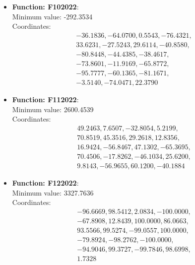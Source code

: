 \documentclass{article}
\begin{document}
\begin{itemize}
    \item \textbf{Function: F102022}: \\
      Minimum value: -292.3534 \\
      Coordinates:
      \[
        \begin{aligned}
          & -36.1836, -64.0700, 0.5543, -76.4321, \\
          & 33.6231, -27.5243, 29.6114, -40.8580, \\
          & -80.8448, -44.4385, -38.4617, \\
          & -73.8601, -11.9169, -65.8772, \\
          & -95.7777, -60.1365, -81.1671, \\
          & -3.5140, -74.0471, 22.3790
        \end{aligned}
      \]

    \item \textbf{Function: F112022}: \\
      Minimum value: 2600.4539 \\
      Coordinates:
      \[
        \begin{aligned}
          & 49.2463, 7.6507, -32.8054, 5.2199, \\
          & 70.8519, 45.3516, 29.2618, 12.8356, \\
          & 16.9424, -56.8467, 47.1302, -65.3695, \\
          & 70.4506, -17.8262, -46.1034, 25.6200, \\
          & 9.8143, -56.9655, 60.1200, -40.1884
        \end{aligned}
      \]

    \item \textbf{Function: F122022}: \\
      Minimum value: 3327.7636 \\
      Coordinates:
      \[
        \begin{aligned}
          & -96.6669, 98.5412, 2.0834, -100.0000, \\
          & -67.8908, 12.8439, 100.0000, 86.0663, \\
          & 93.5566, 99.5274, -99.0557, 100.0000, \\
          & -79.8924, -98.2762, -100.0000, \\
          & -94.9046, 99.3727, -99.7846, 98.6998, \\
          & 1.7328
        \end{aligned}
      \]

  \end{itemize}

  \printbibliography[title={References}]

  
\end{document}
